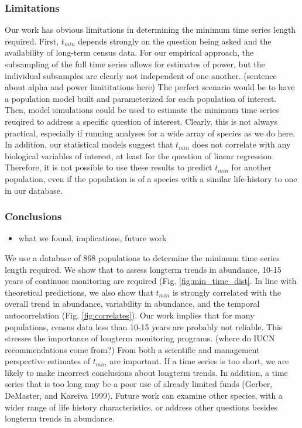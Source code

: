 \documentclass[12pt,]{article}
\providecommand{\tightlist}{%
  \setlength{\itemsep}{0pt}\setlength{\parskip}{0pt}}
\begin{document}
\subsubsection{Limitations}\label{limitations}

Our work has obvious limitations in determining the minimum time series
length required. First, \(t_{min}\) depends strongly on the question
being asked and the availability of long-term census data. For our
empirical approach, the subsampling of the full time series allows for
estimates of power, but the individual subsamples are clearly not
independent of one another. (sentence about alpha and power
limititations here) The perfect scenario would be to have a population
model built and parameterized for each population of interest. Then,
model simulations could be used to estimate the minimum time series
reuqired to address a specific question of interest. Clearly, this is
not always practical, especially if running analyses for a wide array of
species as we do here. In addition, our statistical models suggest that
\(t_{min}\) does not correlate with any biological variables of
interest, at least for the question of linear regression. Therefore, it
is not possible to use these results to predict \(t_{min}\) for another
population, even if the population is of a species with a similar
life-history to one in our database.

\subsubsection{Conclusions}\label{conclusions}

\begin{itemize}
\tightlist
\item
  what we found, implications, future work
\end{itemize}

We use a database of 868 populations to determine the minimum time
series length required. We show that to assess longterm trends in
abundance, 10-15 years of continuos monitoring are required (Fig.
\ref{fig:min_time_dist}. In line with theoretical predictions, we also
show that \(t_{min}\) is strongly correlated with the overall trend in
abundance, variability in abundance, and the temporal autocorrelation
(Fig. \ref{fig:correlates}). Our work implies that for many populations,
census data less than 10-15 years are probably not reliable. This
stresses the importance of longterm monitoring programs. (where do IUCN
recommendations come from?) From both a scientific and management
perspective estimates of \(t_{min}\) are important. If a time series is
too short, we are likely to make incorrect conclusions about longterm
trends. In addition, a time series that is too long may be a poor use of
already limited funds (Gerber, DeMaster, and Kareiva 1999). Future work
can examine other species, with a wider range of life history
characteristics, or address other questions besides longterm trends in
abundance.
\end{document}
